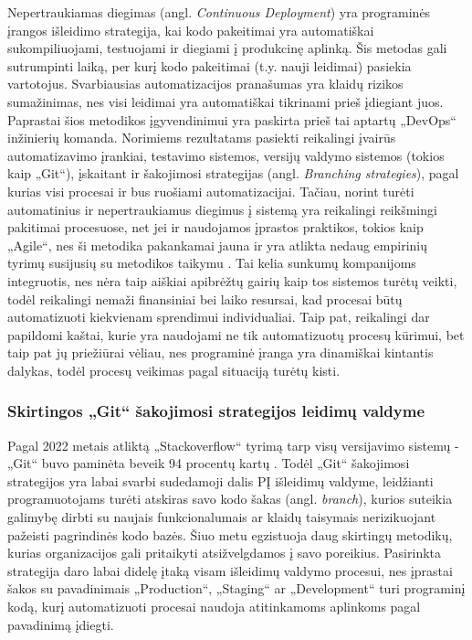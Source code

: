 \documentclass{VUMIFPSkursinis}
\begin{document}
Nepertraukiamas diegimas (angl. \textit{Continuous Deployment}) yra programinės įrangos išleidimo strategija, kai kodo pakeitimai yra automatiškai sukompiliuojami, testuojami ir diegiami į produkcinę aplinką. Šis metodas gali sutrumpinti laiką, per kurį kodo pakeitimai (t.y. nauji leidimai) pasiekia vartotojus. Svarbiausias automatizacijos pranašumas yra klaidų rizikos sumažinimas, nes visi leidimai yra automatiškai tikrinami prieš įdiegiant juos. Paprastai šios metodikos įgyvendinimui yra paskirta prieš tai aptartų „DevOps“ inžinierių komanda. Norimiems rezultatams pasiekti reikalingi įvairūs automatizavimo įrankiai, testavimo sistemos, versijų valdymo sistemos (tokios kaip „Git“), įskaitant ir šakojimosi strategijas (angl. \textit{Branching strategies}), pagal kurias visi procesai ir bus ruošiami automatizacijai. Tačiau, norint turėti automatinius ir nepertraukiamus diegimus į sistemą yra reikalingi reikšmingi pakitimai procesuose, net jei ir naudojamos įprastos praktikos, tokios kaip „Agile“, nes ši metodika pakankamai jauna ir yra atlikta nedaug empirinių tyrimų susijusių su metodikos taikymu \cite{SaltSeptintas}. Tai kelia sunkumų kompanijoms integruotis, nes nėra taip aiškiai apibrėžtų gairių kaip tos sistemos turėtų veikti, todėl reikalingi nemaži finansiniai bei laiko resursai, kad procesai būtų automatizuoti kiekvienam sprendimui individualiai. Taip pat, reikalingi dar papildomi kaštai, kurie yra naudojami ne tik automatizuotų procesų kūrimui, bet taip pat jų priežiūrai vėliau, nes programinė įranga yra dinamiškai kintantis dalykas, todėl procesų veikimas pagal situaciją turėtų kisti.
    
    \subsubsection{Skirtingos „Git“ šakojimosi strategijos leidimų valdyme}

Pagal 2022 metais atliktą „Stackoverflow“ tyrimą tarp visų versijavimo sistemų - „Git“ buvo paminėta beveik 94 procentų kartų \cite{SaltAstuntas}. Todėl „Git“ šakojimosi strategijos yra labai svarbi sudedamoji dalis PĮ išleidimų valdyme, leidžianti programuotojams turėti atskiras savo kodo šakas (angl. \textit{branch}), kurios suteikia galimybę dirbti su naujais funkcionalumais ar klaidų taisymais nerizikuojant pažeisti pagrindinės kodo bazės. Šiuo metu egzistuoja daug skirtingų metodikų, kurias organizacijos gali pritaikyti atsižvelgdamos į savo poreikius. Pasirinkta strategija daro labai didelę įtaką visam išleidimų valdymo procesui, nes įprastai šakos su pavadinimais „Production“, „Staging“ ar „Development“ turi programinį kodą, kurį automatizuoti procesai naudoja atitinkamoms aplinkoms pagal pavadinimą įdiegti.
\end{document}
